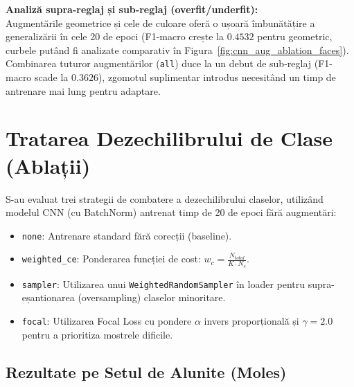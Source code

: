 \documentclass[12pt,a4paper]{article}
\begin{document}
\textbf{Analiză supra-reglaj și sub-reglaj (overfit/underfit):}\\
Augmentările geometrice și cele de culoare oferă o ușoară îmbunătățire a generalizării în cele 20 de epoci (F1-macro crește la $0.4532$ pentru geometric, curbele putând fi analizate comparativ în Figura~\ref{fig:cnn_aug_ablation_faces}). Combinarea tuturor augmentărilor (\texttt{all}) duce la un debut de sub-reglaj (F1-macro scade la $0.3626$), zgomotul suplimentar introdus necesitând un timp de antrenare mai lung pentru adaptare.

\section{Tratarea Dezechilibrului de Clase (Ablații)}
S-au evaluat trei strategii de combatere a dezechilibrului claselor, utilizând modelul CNN (cu BatchNorm) antrenat timp de 20 de epoci fără augmentări:
\begin{itemize}
    \item \texttt{none}: Antrenare standard fără corecții (baseline).
    \item \texttt{weighted\_ce}: Ponderarea funcției de cost: $w_c = \frac{N_{total}}{K \cdot N_c}$.
    \item \texttt{sampler}: Utilizarea unui \texttt{WeightedRandomSampler} în loader pentru supra-eșantionarea (oversampling) claselor minoritare.
    \item \texttt{focal}: Utilizarea Focal Loss cu pondere $\alpha$ invers proporțională și $\gamma=2.0$ pentru a prioritiza mostrele dificile.
\end{itemize}

\subsection{Rezultate pe Setul de Alunite (Moles)}
\begin{table}[h!]
\centering
\setlength{\tabcolsep}{4pt}
\caption{Ablație imbalance pe setul Moles}
\end{table}
\end{document}
